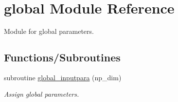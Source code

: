 \hypertarget{namespaceglobal}{}\section{global Module Reference}
\label{namespaceglobal}


Module for global parameters.  


\subsection*{Functions/\+Subroutines}
\begin{DoxyCompactItemize}
\item 
subroutine \hyperlink{namespaceglobal_a930b565da2644b675f35b91735e11ce3}{global\+\_\+inputpara} (np\+\_\+dim)
\begin{DoxyCompactList}\small\item\em Assign global parameters. \end{DoxyCompactList}\end{DoxyCompactItemize}
